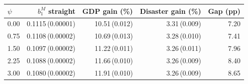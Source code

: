 \begin{tabular}{@{}lrrrr@{}}
\toprule
$\psi$ & $b_1^M$ straight & GDP gain (\%) & Disaster gain (\%) & Gap (pp) \\ \midrule
0.00 & 0.1115\,(0.00001) & 10.51\,(0.012) & 3.31\,(0.009) & 7.20 \\
0.75 & 0.1108\,(0.00002) & 10.69\,(0.013) & 3.28\,(0.010) & 7.41 \\
1.50 & 0.1097\,(0.00002) & 11.22\,(0.011) & 3.26\,(0.011) & 7.96 \\
2.25 & 0.1088\,(0.00002) & 11.66\,(0.010) & 3.26\,(0.009) & 8.40 \\
3.00 & 0.1080\,(0.00002) & 11.91\,(0.010) & 3.26\,(0.009) & 8.65 \\
\bottomrule
\end{tabular}
